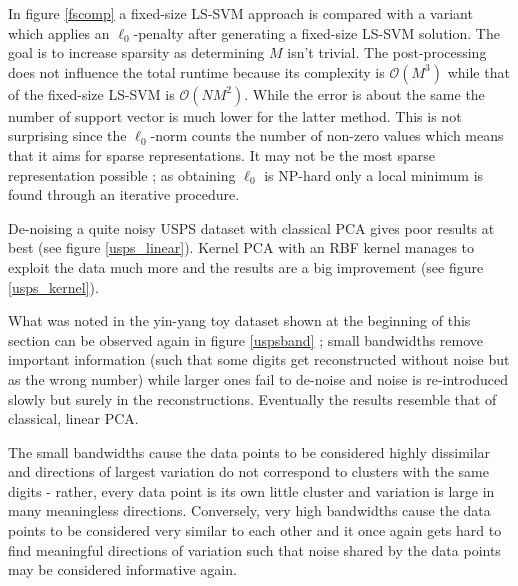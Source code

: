 \par In figure \ref{fscomp} a fixed-size LS-SVM approach is compared with a variant which applies an $\ell_0$-penalty after generating a fixed-size LS-SVM solution. The goal is to increase sparsity as determining $M$ isn't trivial. The post-processing does not influence the total runtime because its complexity is $\mathcal{O}(M^3)$ while that of the fixed-size LS-SVM is $\mathcal{O}(NM^2)$. While the error is about the same the number of support vector is much lower for the latter method. This is not surprising since the $\ell_0$-norm counts the number of non-zero values which means that it aims for sparse representations. It may not be the most sparse representation possible ; as obtaining $\ell_0$ is NP-hard only a local minimum is found through an iterative procedure.


De-noising a quite noisy USPS dataset with classical PCA gives poor results at best (see figure \ref{usps_linear}). Kernel PCA with an RBF kernel manages to exploit the data much more and the results are a big improvement (see figure \ref{usps_kernel}).

\endgroup
\newpage

What was noted in the yin-yang toy dataset shown at the beginning of this section can be observed again in figure \ref{uspsband} ; small bandwidths remove important information (such that some digits get reconstructed without noise but as the wrong number) while larger ones fail to de-noise and noise is re-introduced slowly but surely in the reconstructions. Eventually the results resemble that of classical, linear PCA.

\par The small bandwidths cause the data points to be considered highly dissimilar and directions of largest variation do not correspond to clusters with the same digits - rather, every data point is its own little cluster and variation is large in many meaningless directions. Conversely, very high bandwidths cause the data points to be considered very similar to each other and it once again gets hard to find meaningful directions of variation such that noise shared by the data points may be considered informative again.

